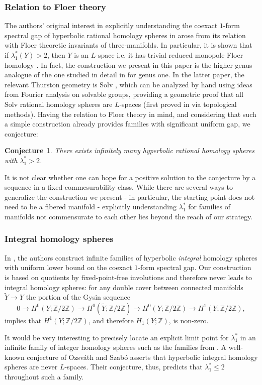 \documentclass[11pt]{amsart}
\newtheorem*{conj*}{Conjecture}
\theoremstyle{definition}
\theoremstyle{remark}
\begin{document}
\subsubsection*{Relation to Floer theory} The authors' original interest in explicitly understanding the coexact $1$-form spectral gap of hyperbolic rational homology spheres in \cite{LL1} arose from its relation with Floer theoretic invariants of three-manifolds. In particular, it is shown that if $\lambda_1^*(Y)>2$, then $Y$ is an $L$-space i.e. it has trivial reduced monopole Floer homology \cite{KM}. In fact, the construction we present in this paper is the higher genus analogue of the one studied in detail in \cite{LinSolv} for genus one. In the latter paper, the relevant Thurston geometry is $\mathrm{Solv}$ \cite{Mar}, which can be analyzed by hand using ideas from Fourier analysis on solvable groups, providing a geometric proof that all $\mathrm{Solv}$ rational homology spheres are $L$-spaces (first proved in \cite{BGW} via topological methods). Having the relation to Floer theory in mind, and considering that such a simple construction already provides families with significant uniform gap, we conjecture: 
\begin{conj*}
There exists infinitely many hyperbolic rational homology spheres with $\lambda_1^*>2$.
\end{conj*}
It is not clear whether one can hope for a positive solution to the conjecture by a sequence in a fixed commesurability class. While there are several ways to generalize the construction we present - in particular, the starting point does not need to be a fibered manifold - explicitly understanding $\lambda_1^*$ for families of manifolds not commensurate to each other lies beyond the reach of our strategy.

\subsubsection*{Integral homology spheres}
In \cite{AAGLZ}, the authors construct infinite families of hyperbolic \textit{integral} homology spheres with uniform lower bound on the coexact $1$-form spectral gap. Our construction is based on quotients by fixed-point-free involutions and therefore never leads to integral homology spheres: for any double cover between connected manifolds $\tilde{Y}\rightarrow Y$ the portion of the Gysin sequence
\begin{equation*}
0\rightarrow H^0(Y;\mathbb{Z}/2\mathbb{Z})\rightarrow H^0(\tilde{Y};\mathbb{Z}/2\mathbb{Z})   \rightarrow H^0(Y;\mathbb{Z}/2\mathbb{Z})   \rightarrow H^1(Y;\mathbb{Z}/2\mathbb{Z}),
\end{equation*}
implies that $H^1(Y;\mathbb{Z}/2\mathbb{Z})$, and therefore $H_1(Y;\mathbb{Z})$, is non-zero.
\par
It would be very interesting to precisely locate an explicit limit point for $\lambda_1^\ast$ in an infinite family of integer homology spheres such as the families from \cite{AAGLZ}. A well-known conjecture of Ozsv\'ath and Szab\'o asserts that hyperbolic integral homology spheres are never $L$-spaces.  Their conjecture, thus, predicts that $\lambda_1^*\leq 2$ throughout such a family.
\end{document}
